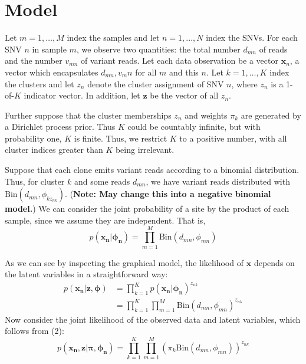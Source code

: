 \documentclass[11pt]{article}
\newcommand{\bx}{\ensuremath{\mathbf{x}}}
\newcommand{\bz}{\ensuremath{\mathbf{z}}}
\begin{document}
\newpage

\section{Model}

Let $m = 1, \ldots, M$ index the samples and let $n = 1, ..., N$ index the SNVs. For each SNV $n$ in sample $m$, we observe two quantities: the total number $d_{mn}$ of reads and the number $v_{mn}$ of variant reads. Let each data observation be a vector $\bx_n$, a vector which encapsulates $d_{mn}, v_mn$ for all $m$ and this $n$. Let $k=1,\ldots,K$ index the clusters and let $z_n$ denote the cluster assignment of SNV $n$, where $z_n$ is a 1-of-$K$ indicator vector. In addition, let $\bz$ be the vector of all $z_n$.

Further suppose that the cluster memberships $z_n$ and weights $\pi_k$ are generated by a Dirichlet process prior. Thus $K$ could be countably infinite, but with probability one, $K$ is finite. Thus, we restrict $K$ to a positive number, with all cluster indices greater than $K$ being irrelevant.

Suppose that each clone emits variant reads according to a binomial distribution. Thus, for cluster $k$ and some reads $d_{mn}$, we have variant reads distributed with $\mathrm{Bin}(d_{mn}, \phi_{kz_{nk}})$. (\textbf{Note: May change this into a negative binomial model.}) We can consider the joint probability of a site by the product of each sample, since we assume they are independent. That is,
\begin{equation}
p(\mathbf{x_n} | \mathbf{\phi_n}) = \prod\limits_{m=1}^M \mathrm{Bin}(d_{mn}, \phi_{mn})
\end{equation}

 As we can see by inspecting the graphical model, the likelihood of $\bx$ depends on the latent variables in a straightforward way:
\begin{align}
p(\mathbf{x_n} | \bz, \mathbf{\phi}) &= \prod\limits_{k=1}^K p(\mathbf{x_n} | \mathbf{\phi_n})^{z_{nk}} \nonumber \\
										&= \prod\limits_{k=1}^K \prod\limits_{m=1}^M \mathrm{Bin}(d_{mn}, \phi_{mn})^{z_{nk}}
\end{align}
Now consider the joint likelihood of the observed data and latent variables, which follows from (2): 
\begin{equation}
p(\mathbf{x_n}, \bz | \mathbf{\pi}, \mathbf{\phi_n}) = \prod\limits_{k=1}^K \prod\limits_{m=1}^M \left(\pi_k \mathrm{Bin}(d_{mn}, \phi_{mn})\right)^{z_{nk}}
\end{equation}
\end{document}
